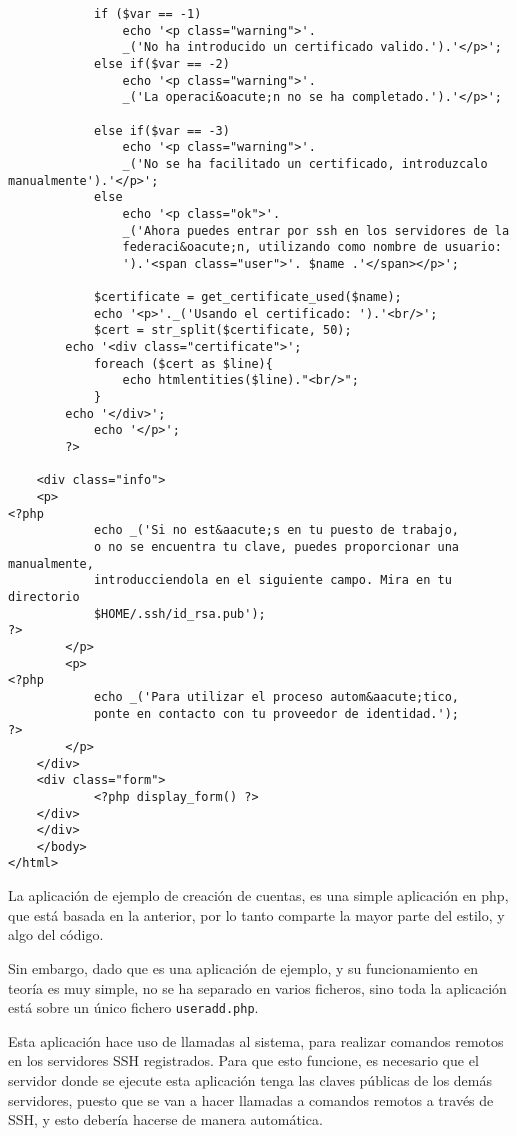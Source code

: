 \begin{lstlisting}
            if ($var == -1)
                echo '<p class="warning">'.
                _('No ha introducido un certificado valido.').'</p>';
            else if($var == -2)
                echo '<p class="warning">'.
                _('La operaci&oacute;n no se ha completado.').'</p>';

            else if($var == -3)
                echo '<p class="warning">'.
                _('No se ha facilitado un certificado, introduzcalo manualmente').'</p>';
            else
                echo '<p class="ok">'.
                _('Ahora puedes entrar por ssh en los servidores de la
                federaci&oacute;n, utilizando como nombre de usuario: 
                ').'<span class="user">'. $name .'</span></p>';
                
            $certificate = get_certificate_used($name);
            echo '<p>'._('Usando el certificado: ').'<br/>';
            $cert = str_split($certificate, 50);
	    echo '<div class="certificate">';
            foreach ($cert as $line){
                echo htmlentities($line)."<br/>";
            }
	    echo '</div>';
            echo '</p>';
        ?>

	<div class="info">
    <p>
<?php
            echo _('Si no est&aacute;s en tu puesto de trabajo,
            o no se encuentra tu clave, puedes proporcionar una manualmente,
            introducciendola en el siguiente campo. Mira en tu directorio
            $HOME/.ssh/id_rsa.pub');
?>
        </p>
        <p>
<?php
            echo _('Para utilizar el proceso autom&aacute;tico,
            ponte en contacto con tu proveedor de identidad.');
?>
        </p>
	</div>
	<div class="form">
            <?php display_form() ?>
	</div>
	</div>
    </body>
</html>

    \end{lstlisting}

    La aplicación de ejemplo de creación de cuentas, es una simple
    aplicación en php, que está basada en la anterior, por lo tanto
    comparte la mayor parte del estilo, y algo del código.

    Sin embargo, dado que es una aplicación de ejemplo, y su
    funcionamiento en teoría es muy simple, no se ha separado en
    varios ficheros, sino toda la aplicación está sobre un único
    fichero \texttt{useradd.php}.

    Esta aplicación hace uso de llamadas al sistema, para realizar
    comandos remotos en los servidores SSH registrados. Para que esto
    funcione, es necesario que el servidor donde se ejecute esta
    aplicación tenga las claves públicas de los demás servidores,
    puesto que se van a hacer llamadas a comandos remotos a través de
    SSH, y esto debería hacerse de manera automática.

